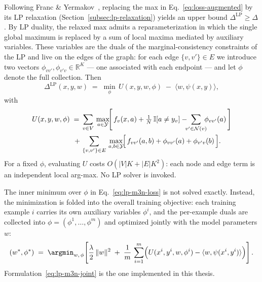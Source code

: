 Following Franc \& Yermakov~\cite{franc2021}, replacing the max in
Eq.~\eqref{eq:loss-augmented} by its LP relaxation
(Section~\ref{subsec:lp-relaxation}) yields an upper bound
$\Delta^{\mathrm{LP}} \geq \Delta$. By LP duality, the relaxed max
admits a reparameterization in which the single global maximum is
replaced by a sum of local maxima mediated by auxiliary variables.
These variables are the duals of the marginal-consistency
constraints of the LP and live on the edges of the graph: for each
edge $\{v, v'\} \in E$ we introduce two vectors $\phi_{vv'},
\phi_{v'v} \in \mathbb{R}^{K}$ --- one associated with each
endpoint --- and let $\phi$ denote the full collection. Then
\begin{equation}
    \Delta^{\mathrm{LP}}(x, y, w) \;=\;
    \min_{\phi}\, U(x, y, w, \phi) \;-\; \langle w, \psi(x, y) \rangle,
    \label{eq:lp-m3n-loss}
\end{equation}
with
\begin{equation}
    \begin{split}
    U(x, y, w, \phi) \;=\;
    &\sum_{v \in V}\, \max_{a \in \mathcal{Y}}\!
    \Biggl[\,
        f_{v}(x, a) + \tfrac{1}{N}\,\mathbb{I}[a \neq y_{v}]
        - \!\!\!\sum_{v' \in \mathcal{N}(v)}\!\!\!\phi_{vv'}(a)
    \,\Biggr] \\
    +\,
    &\sum_{\{v, v'\} \in E}\, \max_{a, b \in \mathcal{Y}}\!
    \Bigl[\,
        f_{vv'}(a, b) + \phi_{vv'}(a) + \phi_{v'v}(b)
    \,\Bigr].
    \end{split}
    \label{eq:lp-m3n-U}
\end{equation}
For a fixed $\phi$, evaluating $U$ costs
$O(|V| K + |E| K^{2})$: each node and edge term is an
independent local arg-max. No LP solver is invoked.

The inner minimum over $\phi$ in Eq.~\eqref{eq:lp-m3n-loss} is not
solved exactly. Instead, the minimization is folded into the
overall training objective: each training example $i$ carries its
own auxiliary variables $\phi^{i}$, and the per-example duals are
collected into $\phi = (\phi^1, \ldots, \phi^m)$ and optimized
jointly with the model parameters $w$:
\begin{equation}
    (w^{*}, \phi^{*}) \;=\;
    \argmin_{w,\, \phi}\!\left[
    \frac{\lambda}{2}\, \|w\|^{2}
    \;+\; \frac{1}{m}\, \sum_{i=1}^{m}
    \Bigl(
        U(x^i, y^i, w, \phi^{i})
        - \langle w, \psi(x^i, y^i) \rangle
    \Bigr)
    \right].
    \label{eq:lp-m3n-joint}
\end{equation}
Formulation~\eqref{eq:lp-m3n-joint} is the one implemented in this
thesis.

